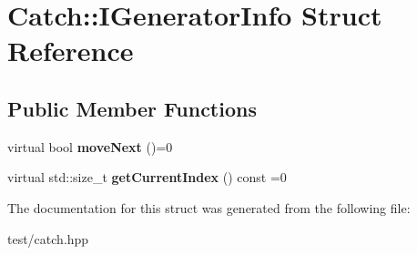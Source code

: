 \hypertarget{structCatch_1_1IGeneratorInfo}{}\section{Catch\+:\+:I\+Generator\+Info Struct Reference}
\label{structCatch_1_1IGeneratorInfo}
\subsection*{Public Member Functions}
\begin{DoxyCompactItemize}
\item 
virtual bool {\bfseries move\+Next} ()=0\hypertarget{structCatch_1_1IGeneratorInfo_a2b86711ca7009903edfe27ed62b515ef}{}\label{structCatch_1_1IGeneratorInfo_a2b86711ca7009903edfe27ed62b515ef}

\item 
virtual std\+::size\+\_\+t {\bfseries get\+Current\+Index} () const =0\hypertarget{structCatch_1_1IGeneratorInfo_a6a0dca712d31f6849fd9447b1344673a}{}\label{structCatch_1_1IGeneratorInfo_a6a0dca712d31f6849fd9447b1344673a}

\end{DoxyCompactItemize}


The documentation for this struct was generated from the following file\+:\begin{DoxyCompactItemize}
\item 
test/catch.\+hpp\end{DoxyCompactItemize}
